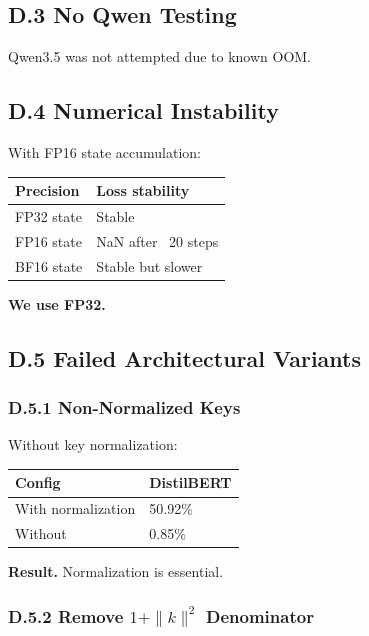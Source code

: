 \subsection{D.3 No Qwen Testing}

Qwen3.5 was not attempted due to known OOM.

\subsection{D.4 Numerical Instability}

With FP16 state accumulation:

\begin{table}[H]
\centering
\small
\begin{tabular}{ll}
\toprule
\textbf{Precision} & \textbf{Loss stability} \\
\midrule
FP32 state & Stable \\
FP16 state & NaN after ~20 steps \\
BF16 state & Stable but slower \\
\bottomrule
\end{tabular}
\end{table}

\textbf{We use FP32.}

\subsection{D.5 Failed Architectural Variants}

\subsubsection{D.5.1 Non-Normalized Keys}

Without key normalization:

\begin{table}[H]
\centering
\small
\begin{tabular}{ll}
\toprule
\textbf{Config} & \textbf{DistilBERT} \\
\midrule
With normalization & 50.92\% \\
Without & 0.85\% \\
\bottomrule
\end{tabular}
\end{table}

\textbf{Result.} Normalization is essential.

\subsubsection{D.5.2 Remove $1 + \|k\|^2$ Denominator}

